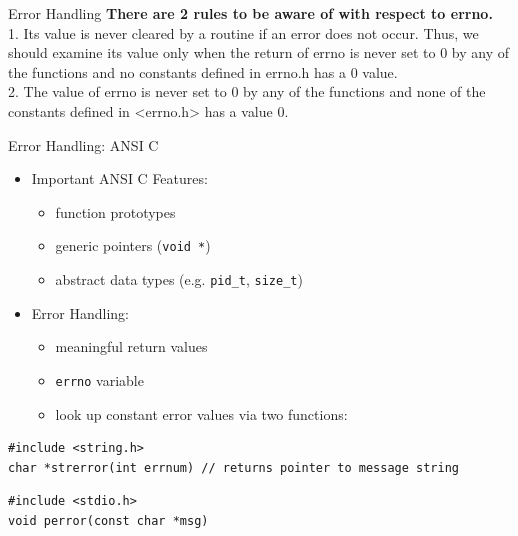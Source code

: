 \documentclass[newPxFont,sthlmFooter,nooffset]{beamer}
\begin{document}
\begin{frame}[t]{Error Handling}
\textbf{There are 2 rules to be aware of with respect to errno.} 
\\[6pt]1. Its value is never cleared by a routine if an error does not occur. Thus, we should examine its value only when the return of errno is never set to 0 by any of the functions and no constants defined in errno.h has a 0 value.
\\[6pt]2. The value of errno is never set to 0 by any of the functions and none of the constants defined in <errno.h> has a value 0. 

\end{frame}

\begin{frame}[containsverbatim,t]{Error Handling: ANSI C}
\begin{itemize}
	\item	Important ANSI C Features:
		\begin{itemize}
			\item function prototypes
			\item generic pointers ({\tt void *})
			\item abstract data types (e.g. {\tt pid\_t}, {\tt size\_t})
		\end{itemize}
	\item	Error Handling:
		\begin{itemize}
			\item meaningful return values
			\item {\tt errno} variable
			\item look up constant error values via two functions:
		\end{itemize}
\end{itemize}

\begin{lstlisting}
#include <string.h>
char *strerror(int errnum) // returns pointer to message string
\end{lstlisting}

\bigskip

\begin{lstlisting}
#include <stdio.h>
void perror(const char *msg)
\end{lstlisting}

\end{frame}
\end{document}
